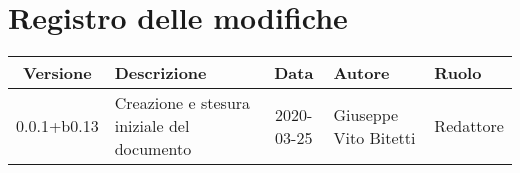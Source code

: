 \section*{Registro delle modifiche}

\begin{center}
	\begin{longtable}{|c|p{3.5cm}|c|p{3cm}|p{3cm}|}
	\hline
	\rowcolor{lighter-grayer}
	\textbf{Versione} & \textbf{Descrizione} & \textbf{Data} & \textbf{Autore} & \textbf{Ruolo} \\
	\hline
	\endfirsthead


	\hline
	0.0.1+b0.13 & Creazione e stesura iniziale del documento & 2020-03-25 & Giuseppe Vito Bitetti & Redattore \\
	\hline

	\end{longtable}
\end{center}
